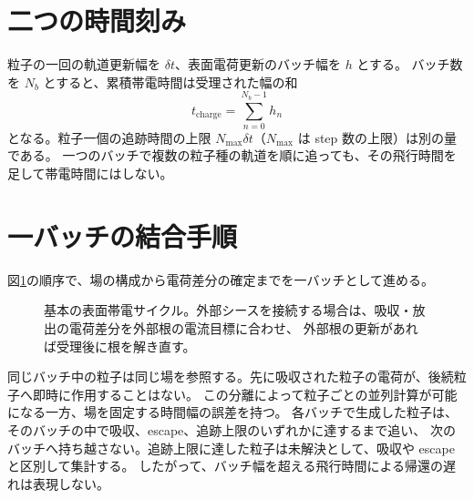 \section{二つの時間刻み}
粒子の一回の軌道更新幅を $\delta t$、表面電荷更新のバッチ幅を $h$ とする。
バッチ数を $N_b$ とすると、累積帯電時間は受理された幅の和
\begin{equation}
 t_{\mathrm{charge}}=\sum_{n=0}^{N_b-1} h_n
\end{equation}
となる。粒子一個の追跡時間の上限 $N_{\max}\delta t$（$N_{\max}$ は step 数の上限）は別の量である。
一つのバッチで複数の粒子種の軌道を順に追っても、その飛行時間を足して帯電時間にはしない。

\section{一バッチの結合手順}
図\ref{fig:batch}の順序で、場の構成から電荷差分の確定までを一バッチとして進める。
\begin{figure}[htbp]
\centering
{}
\caption[基本の表面帯電サイクル]{基本の表面帯電サイクル。外部シースを接続する場合は、吸収・放出の電荷差分を外部根の電流目標に合わせ、
外部根の更新があれば受理後に根を解き直す。}
\label{fig:batch}
\end{figure}
同じバッチ中の粒子は同じ場を参照する。先に吸収された粒子の電荷が、後続粒子へ即時に作用することはない。
この分離によって粒子ごとの並列計算が可能になる一方、場を固定する時間幅の誤差を持つ。
各バッチで生成した粒子は、そのバッチの中で吸収、escape、追跡上限のいずれかに達するまで追い、
次のバッチへ持ち越さない。追跡上限に達した粒子は未解決として、吸収や escape と区別して集計する。
したがって、バッチ幅を超える飛行時間による帰還の遅れは表現しない。
